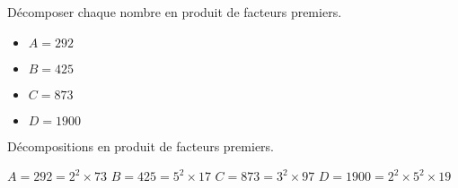 \begin{exercice*}
    \label{N2exosBase014}
    Décomposer chaque nombre en produit de facteurs premiers.
    \begin{itemize}
        \item[] $A=292$
        \item[] $B=425$
        \item[] $C=873$
        \item[] $D=\num{1900}$
    \end{itemize}

\end{exercice*}
\begin{corrige}
    Décompositions en produit de facteurs premiers.
    
    \begin{itemize}
        \def\item{}
        \item $A=292=2^2\times 73$
        \item $B=425=5^2\times 17$
        \item $C=873=3^2\times 97$
        \item $D=\num{1900}=2^2\times 5^2 \times 19$
    \end{itemize}

\end{corrige}

